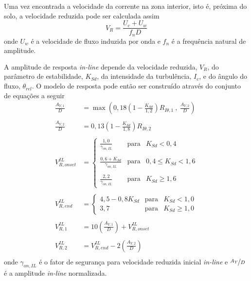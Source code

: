 Uma vez encontrada a velocidade da corrente na zona interior, isto é, próxima do solo, a velocidade reduzida pode ser calculada assim
\begin{equation}
\label{eq:jdsn-Vr}
V_R = \frac{U_c + U_w}{f_n D}
\end{equation}
onde $U_w$ é a velocidade de fluxo induzida por onda e $f_n$ é a frequência natural de amplitude.

A amplitude de resposta \textit{in-line} depende da velocidade reduzida, $V_R$, do parâmetro de estabilidade, $K_\mathit{Sd}$, da intensidade da turbulência, $\mathit{I}_c$, e do ângulo do fluxo, $\theta_\mathit{rel}$. O modelo de resposta pode então ser construído através do conjunto de equações a seguir
\begin{equation}
\label{eq:jdsn-Vronset}
\begin{aligned}
\frac{A_{Y,1}}{D} &= \max\left(0,18 \left(1 - \frac{K_\mathit{Sd}}{1,2}\right) R_{I\theta,1} ~,~\frac{A_{Y,2}}{D}\right)\\
\\
\frac{A_{Y,2}}{D} &= 0,13 \left(1 - \frac{K_\mathit{Sd}}{1,8}\right) R_{I\theta,2}\\
\\
V_{R,\mathit{onset}}^\mathit{IL} &= \left\{
\begin{array}{ccc}
\frac{1,0}{ \gamma_{\mathit{on}, \mathit{IL}} }               & \mathrm{para} & K_\mathit{Sd} < 0,4\\
\\
\frac{0,6 + K_\mathit{Sd}}{\gamma_{\mathit{on}, \mathit{IL}}} & \mathrm{para} & 0,4 \leq K_\mathit{Sd} < 1,6 \\
\\
\frac{2,2}{\gamma_{\mathit{on}, \mathit{IL}}}                 & \mathrm{para} & K_\mathit{Sd} \geq 1,6
\end{array}
\right.\\
\\
V_{R, \mathit{end}}^\mathit{IL} &=
\left\{
\begin{array}{ccc}
4,5 - 0,8 K_\mathit{Sd} & \mathrm{para} & K_\mathit{Sd} < 1,0 \\
3,7                     & \mathrm{para} & K_\mathit{Sd} \geq 1,0 
\end{array}
\right.\\
\\
V_{R, 1}^\mathit{IL} &= 10 \left(\frac{A_{Y, 1}}{D}\right)+ V_{R,\mathit{onset}}^\mathit{IL}\\
\\
V_{R, 2}^\mathit{IL} &=  V_{R, \mathit{end}}^\mathit{IL} - 2 \left(\frac{A_{Y, 2}}{D}\right)\\
\end{aligned}
\end{equation}
onde $\gamma_{\mathit{on}, \mathit{IL}}$ é o fator de segurança para velocidade reduzida inicial \textit{in-line} e $\nicefrac{A_Y}{D}$ é a amplitude \textit{in-line} normalizada.

